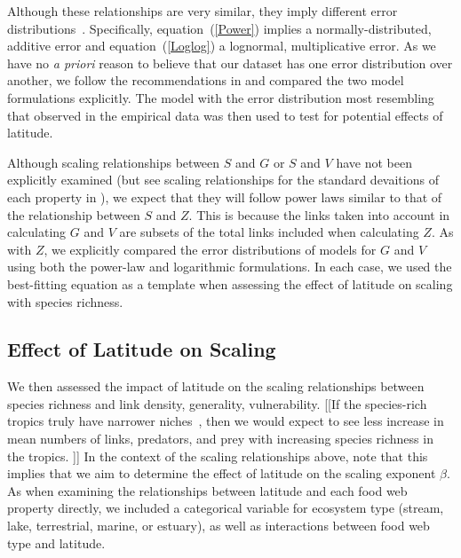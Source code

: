 \documentclass[12pt]{article}
\begin{document}
  \noindent Although these relationships are very similar, they imply different error distributions~\citep{Xiao2011}.
  Specifically, equation~(\ref{Power}) implies a normally-distributed, additive error and equation~(\ref{Loglog}) a lognormal,
  multiplicative error. As we have no \emph{a priori} reason to believe that our dataset has one error distribution
  over another, we follow the recommendations in \citet{Xiao2011} and compared the two
  model formulations explicitly. The model with the error distribution most resembling that observed in the empirical
  data was then used to test for potential effects of latitude.


  Although scaling relationships between $S$ and $G$ or $S$ and $V$ have not been explicitly examined (but see scaling 
  relationships for the standard devaitions of each property in \citet{Riede2010}), we expect that they will follow
  power laws similar to that of the relationship between $S$ and $Z$. This is because the links taken into account in
  calculating $G$ and $V$ are subsets of the total links included when calculating $Z$. As with $Z$, we explicitly 
  compared the error distributions of models for $G$ and $V$ using both the power-law and logarithmic formulations. 
  In each case, we used the best-fitting equation as a template when assessing the effect of latitude on scaling with
  species richness.



\subsection*{Effect of Latitude on Scaling}



  We then assessed the impact of latitude on the scaling relationships between species richness and 
  link density, generality, vulnerability.
  [[If the species-rich tropics truly have narrower 
  niches~\citep{Brown2004}, then we would expect to see less increase in mean numbers of links, 
  predators, and prey with increasing species richness in the tropics. ]]
  In the context of the scaling relationships above, note that this implies that we aim to determine the effect of latitude on
  the scaling exponent $\beta$. As when examining the relationships between latitude and each food 
  web property directly, we included a categorical variable for ecosystem type (stream, lake, 
  terrestrial, marine, or estuary), as well as interactions between food web type and latitude.
\end{document}
